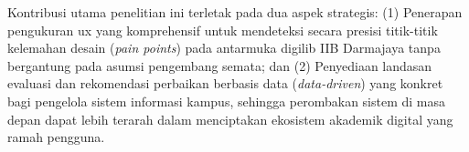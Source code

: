 Kontribusi utama penelitian ini terletak pada dua aspek strategis: (1) Penerapan pengukuran \gls{ux} yang komprehensif untuk mendeteksi secara presisi titik-titik kelemahan desain (\textit{pain points}) pada antarmuka \gls{digilib} IIB Darmajaya tanpa bergantung pada asumsi pengembang semata; dan (2) Penyediaan landasan evaluasi dan rekomendasi perbaikan berbasis data (\textit{data-driven}) yang konkret bagi pengelola sistem informasi kampus, sehingga perombakan sistem di masa depan dapat lebih terarah dalam menciptakan ekosistem akademik digital yang ramah pengguna.